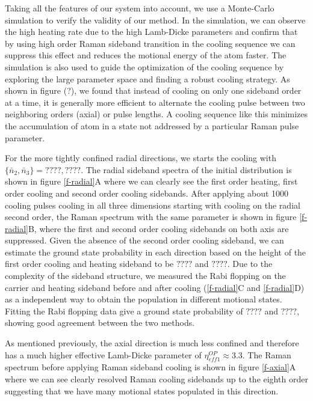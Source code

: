 \documentclass[aps,prl,twocolumn,groupedaddress]{revtex4-1}
\begin{document}
Taking all the features of our system into account, we use a Monte-Carlo simulation to verify
the validity of our method.
In the simulation, we can observe the high heating rate due to the high Lamb-Dicke parameters
and confirm that by using high order Raman sideband transition in the cooling sequence we can
suppress this effect and reduces the motional energy of the atom faster.
The simulation is also used to guide the optimization of the cooling sequence by exploring the
large parameter space and finding a robust cooling strategy. As shown in figure (?),
we found that instead of cooling on only one sideband order at a time, it is generally more
efficient to alternate the cooling pulse between two neighboring orders (axial) or pulse lengths.
A cooling sequence like this minimizes the accumulation of atom in a state not addressed by a
particular Raman pulse parameter.

For the more tightly confined radial directions,
we starts the cooling with $\{\bar n_2, \bar n_3\}=????, ????$.
The radial sideband spectra of the initial distribution is shown in figure \ref{f-radial}A
where we can clearly see the first order heating, first order cooling and
second order cooling sidebands.
After applying about 1000 cooling pulses cooling in all three dimensions
starting with cooling on the radial second order,
the Raman spectrum with the same parameter is shown in figure \ref{f-radial}B,
where the first and second order cooling sidebands on both axis are suppressed.
Given the absence of the second order cooling sideband,
we can estimate the ground state probability in each direction based on the height of
the first order cooling and heating sideband to be $????$ and $????$.
Due to the complexity of the sideband structure,
we measured the Rabi flopping on the carrier and heating sideband before and after cooling
(\ref{f-radial}C and \ref{f-radial}D)
as a independent way to obtain the population in different motional states.
Fitting the Rabi flopping data give a ground state probability of $????$ and $????$,
showing good agreement between the two methods.

As mentioned previously, the axial direction is much less confined and therefore has a much higher
effective Lamb-Dicke parameter of $\eta^{OP}_{eff1}\approx3.3$. The Raman spectrum before applying Raman sideband cooling is shown in figure \ref{f-axial}A where we can see clearly resolved Raman cooling sidebands up to the eighth order suggesting that we have many motional states populated in this direction.



\end{document}
